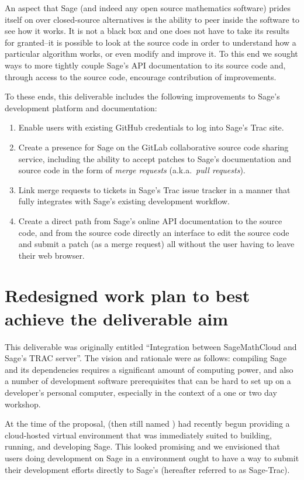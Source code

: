 An aspect that Sage (and indeed any open source mathematics software) prides
itself on over closed-source alternatives is the ability to peer inside the
software to see how it works.  It is not a black box and one does not have to
take its results for granted--it is possible to look at the source code in
order to understand how a particular algorithm works, or even modify and
improve it.  To this end we sought ways to more tightly couple Sage's API
documentation to its source code and, through access to the source code,
encourage contribution of improvements.

To these ends, this deliverable includes the following improvements to Sage's
development platform and documentation:
\begin{enumerate}
\item Enable users with existing GitHub credentials to log into Sage's
    Trac site.
\item Create a presence for Sage on the GitLab collaborative source code
    sharing service, including the ability to accept patches to Sage's
    documentation and source code in the form of {\em merge requests}
    (a.k.a.~{\em pull requests}).
\item Link \GitLab merge requests to tickets in Sage's Trac issue tracker in
    a manner that fully integrates with Sage's existing development workflow.
\item Create a direct path from Sage's online API documentation to the source
    code, and from the source code directly an interface to edit the source
    code and submit a patch (as a merge request) all without the user having to
    leave their web browser.
\end{enumerate}

\hypertarget{redesigned-work-plan}{%
\section{Redesigned work plan to best achieve the deliverable aim\label{redesigned-work-plan}}}

This deliverable was originally entitled “Integration between SageMathCloud and
Sage's TRAC server”. The vision and rationale were as follows: compiling Sage
and its dependencies requires a significant amount of computing power, and also
a number of development software prerequisites that can be hard to set up on a
developer's personal computer, especially in the context of a one or two day
workshop.

At the time of the proposal, \cocalc (then still named \SMC) had recently begun
providing a cloud-hosted virtual environment that was immediately suited to
building, running, and developing Sage. This looked promising and we envisioned
that users doing development on Sage in a \cocalc environment ought to have a
way to submit their development efforts directly to Sage's \Trac (hereafter
referred to as Sage-Trac).

